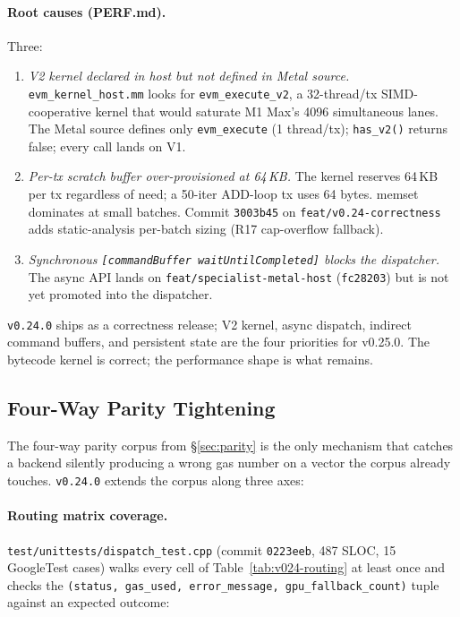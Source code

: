 \paragraph{Root causes (PERF.md).} Three:

\begin{enumerate}
  \item \emph{V2 kernel declared in host but not defined in Metal
    source.} \texttt{evm\_kernel\_host.mm} looks for
    \texttt{evm\_execute\_v2}, a 32-thread/tx SIMD-cooperative kernel
    that would saturate M1 Max's 4096 simultaneous lanes. The Metal
    source defines only \texttt{evm\_execute} (1 thread/tx);
    \texttt{has\_v2()} returns false; every call lands on V1.
  \item \emph{Per-tx scratch buffer over-provisioned at 64\,KB.} The
    kernel reserves 64\,KB per tx regardless of need; a 50-iter
    ADD-loop tx uses 64 bytes. memset dominates at small batches.
    Commit \texttt{3003b45} on \texttt{feat/v0.24-correctness} adds
    static-analysis per-batch sizing (R17 cap-overflow fallback).
  \item \emph{Synchronous \texttt{[commandBuffer waitUntilCompleted]}
    blocks the dispatcher.} The async API lands on
    \texttt{feat/specialist-metal-host} (\texttt{fc28203}) but is
    not yet promoted into the dispatcher.
\end{enumerate}

\texttt{v0.24.0} ships as a correctness release; V2 kernel, async
dispatch, indirect command buffers, and persistent state are the four
priorities for v0.25.0. The bytecode kernel is correct; the
performance shape is what remains.

\subsection{Four-Way Parity Tightening}
\label{sec:v024:parity}

The four-way parity corpus from \S\ref{sec:parity} is the only
mechanism that catches a backend silently producing a wrong gas number
on a vector the corpus already touches. \texttt{v0.24.0} extends the
corpus along three axes:

\paragraph{Routing matrix coverage.}
\texttt{test/unittests/dispatch\_test.cpp} (commit \texttt{0223eeb},
487 SLOC, 15 GoogleTest cases) walks every cell of
Table~\ref{tab:v024-routing} at least once and checks the
\texttt{(status, gas\_used, error\_message, gpu\_fallback\_count)}
tuple against an expected outcome:

